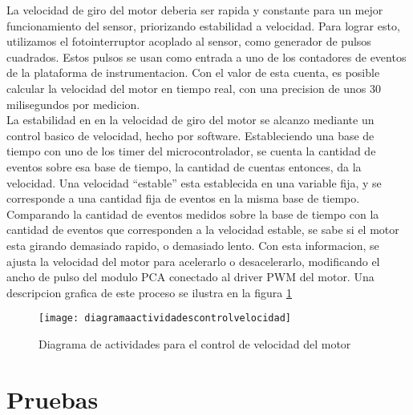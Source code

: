 La velocidad de giro del motor deberia ser rapida y constante para un mejor funcionamiento del sensor, priorizando estabilidad a velocidad. Para lograr esto, utilizamos el fotointerruptor acoplado al sensor, como generador de pulsos cuadrados. Estos pulsos se usan como entrada a uno de los contadores de eventos de la plataforma de instrumentacion. Con el valor de esta cuenta, es posible calcular la velocidad del motor en tiempo real, con una precision de unos 30 milisegundos por medicion. \\

La estabilidad en en la velocidad de giro del motor se alcanzo mediante un control basico de velocidad, hecho por software. Estableciendo una base de tiempo con uno de los timer del microcontrolador, se cuenta la cantidad de eventos sobre esa base de tiempo, la cantidad de cuentas entonces, da la velocidad. Una velocidad ``estable'' esta establecida en una variable fija, y se corresponde a una cantidad fija de eventos en la misma base de tiempo. Comparando la cantidad de eventos medidos sobre la base de tiempo con la cantidad de eventos que corresponden a la velocidad estable, se sabe si el motor esta girando demasiado rapido, o demasiado lento. Con esta informacion, se ajusta la velocidad del motor para acelerarlo o desacelerarlo, modificando el ancho de pulso del modulo PCA conectado al driver PWM del motor. Una descripcion grafica de este proceso se ilustra en la figura \ref{fig:diagramaactividadescontrolvelocidad}

\begin{figure}[h]
  \centering
  \texttt{[image: diagramaactividadescontrolvelocidad]}
  \caption{Diagrama de actividades para el control de velocidad del motor}\label{fig:diagramaactividadescontrolvelocidad}
\end{figure}





\section{Pruebas} %
\label{it6:sec:pruebas}

